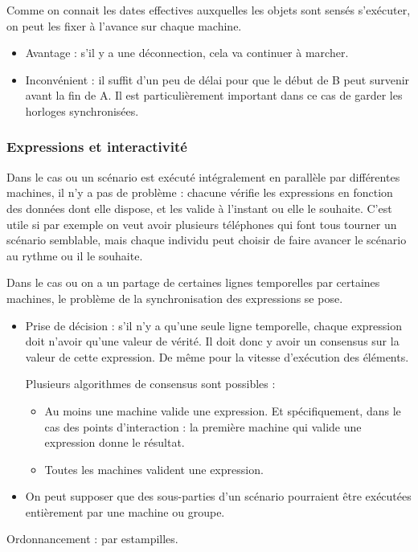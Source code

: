 \documentclass{article}
\begin{document}
Comme on connait les dates effectives auxquelles les objets sont sensés s'exécuter, on peut les fixer à l'avance sur chaque machine. 

\begin{itemize}
\item Avantage : s'il y a une déconnection, cela va continuer à marcher.
\item Inconvénient : il suffit d'un peu de délai pour que le début de B peut survenir avant la fin de A. 
Il est particulièrement important dans ce cas de garder les horloges synchronisées.
\end{itemize}

\subsubsection{Expressions et interactivité}
Dans le cas ou un scénario est exécuté intégralement en parallèle par différentes machines, il n'y a pas de problème : chacune vérifie les expressions en fonction des données dont elle dispose, et les valide à l'instant ou elle le souhaite. C'est utile si par exemple on veut avoir plusieurs téléphones qui font tous tourner un scénario semblable, mais chaque individu peut choisir de faire avancer le scénario au rythme ou il le souhaite.

Dans le cas ou on a un partage de certaines lignes temporelles par certaines machines, le problème de la synchronisation des expressions se pose.

\begin{itemize}
	\item Prise de décision : s'il n'y a qu'une seule ligne temporelle, chaque expression doit n'avoir qu'une valeur de vérité. Il doit donc y avoir un consensus sur la valeur de cette expression. De même pour la vitesse d'exécution des éléments.
    
    Plusieurs algorithmes de consensus sont possibles : 
    \begin{itemize}
        \item Au moins une machine valide une expression. 
        Et spécifiquement, dans le cas des points d'interaction : la première machine qui valide une expression donne le résultat.
        \item Toutes les machines valident une expression.
    \end{itemize}

	\item On peut supposer que des sous-parties d'un scénario pourraient être exécutées entièrement par une machine ou groupe.
\end{itemize}
Ordonnancement : par estampilles.
\end{document}
